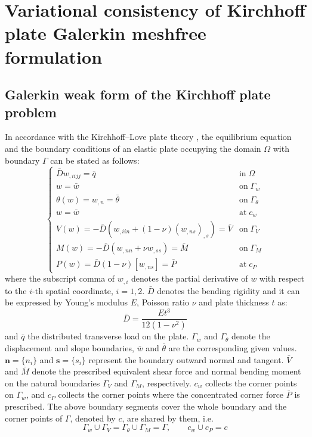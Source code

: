 \section{Variational consistency of Kirchhoff plate Galerkin meshfree formulation}\label{sec:formulation}

\subsection{Galerkin weak form of the Kirchhoff plate problem}\label{sec:weakform}

In accordance with the Kirchhoff--Love plate theory \cite{}, the equilibrium equation and the boundary conditions of an elastic plate occupying the domain $\Omega$ with boundary $\Gamma$ can be stated as follows:
\begin{equation}\label{strong}
	\begin{cases}
		\bar D w_{,iijj}=\bar q & \text{in}\;\Omega\\
		w=\bar{w} & \text{on}\;\Gamma_{w}\\
		\theta(w)=w_{,n}=\bar{\theta} & \text{on}\;\Gamma_{\theta}\\
		w=\bar{w} & \text{at}\;c_w\\
		V(w)=-\bar D\left(w_{,iin} +(1-\nu)\left(w_{,ns}\right)_{,s}\right)=\bar{V} & \text{on}\;\Gamma_{V}\\
		M(w)=-\bar D\left(w_{,nn}+\nu w_{,ss}\right)=\bar{M} & \text{on}\;\Gamma_{M}\\
		P(w)=\bar D(1-\nu)\left[w_{,ns}\right]=\bar{P} & \text{at}\;c_P
	\end{cases}
\end{equation}
where the subscript comma of $w_{,i}$ denotes the partial derivative of $w$ with respect to the $i$-th spatial coordinate, $i=1,2$. $\bar D$ denotes the bending rigidity and it can be expressed by Young's modulus $E$, Poisson ratio $\nu$ and plate thickness $t$ as:
\begin{equation}
	\bar D=\frac{Et^{3}}{12(1-\nu^{2})}
\end{equation}
and $\bar q$ the distributed transverse load on the plate.
$\Gamma_{w}$ and $\Gamma_{\theta}$ denote the displacement and slope boundaries, $\bar{w}$ and $\bar{\theta}$ are the corresponding given values.
$\boldsymbol{n}=\{n_i\}$ and $\boldsymbol{s}=\{s_i\}$ represent the boundary outward normal and tangent.
$\bar{V}$ and $\bar{M}$ denote the prescribed equivalent shear force and normal bending moment on the natural boundaries $\Gamma_{V}$ and $\Gamma_{M}$, respectively.
$c_w$ collects the corner points on $\Gamma_{w}$, and $c_P$ collects the corner points where the concentrated corner force $\bar{P}$ is prescribed.
The above boundary segments cover the whole boundary and the corner points of $\Gamma$, denoted by $c$, are shared by them, i.e.
\begin{equation}\label{boundary_relations}
	\Gamma_{w}\cup\Gamma_{V}=\Gamma_{\theta}\cup\Gamma_{M}=\Gamma,\qquad c_w\cup c_P=c
\end{equation}


